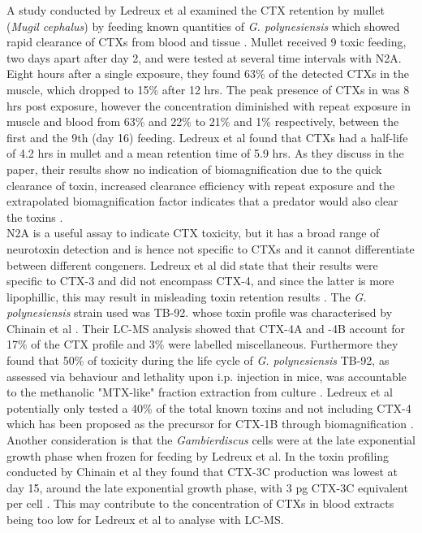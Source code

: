 \documentclass[12pt]{article}
\begin{document}
A study conducted by Ledreux et al examined the CTX retention by mullet (\emph{Mugil cephalus}) by feeding known quantities of \emph{G. polynesiensis} which showed rapid clearance of CTXs from blood and tissue \cite{ledreux2014dynamics}. 
Mullet received 9 toxic feeding, two days apart after day 2, and were tested at several time intervals with N2A. Eight hours after a single exposure, they found 63\% of the detected CTXs in the muscle, which dropped to 15\% after 12 hrs. The peak presence of CTXs in was 8 hrs post exposure, however the concentration diminished with repeat exposure in muscle and blood from 63\% and 22\% to 21\% and 1\% respectively, between the first and the 9th (day 16) feeding. Ledreux et al found that CTXs had a half-life of 4.2 hrs in mullet and a mean retention time of 5.9 hrs. As they discuss in the paper, their results show no indication of biomagnification due to the quick clearance of toxin, increased clearance efficiency with repeat exposure and the extrapolated biomagnification factor indicates that a predator would also clear the toxins  \cite{ledreux2014dynamics}. \\
 N2A is a useful assay to indicate CTX toxicity, but it has a broad range of neurotoxin detection and is  hence not specific to CTXs \cite{ebesu2012comment} and it cannot differentiate between different congeners. Ledreux et al did state that their results were specific to CTX-3 and did not encompass CTX-4, and since the latter is more lipophillic, this may result in misleading toxin retention results \cite{ledreux2014dynamics}. The \emph{G. polynesiensis} strain used was TB-92. whose toxin profile was characterised by Chinain et al \cite{chinain2010growth}. Their LC-MS analysis showed that CTX-4A and -4B account for 17\% of the CTX profile and 3\% were labelled miscellaneous. Furthermore they found that 50\% of toxicity during the life cycle of \emph{G. polynesiensis} TB-92, as assessed via behaviour and lethality upon i.p. injection in mice, was accountable to the methanolic "MTX-like" fraction extraction from culture \cite{chinain2010growth}. Ledreux et al potentially only tested a 40\% of the total known toxins and not including CTX-4 which has been proposed as the precursor for CTX-1B through biomagnification \cite{murata1990structures}. Another consideration is that the \emph{Gambierdiscus} cells were at the late exponential growth phase when frozen for feeding by Ledreux et al. In the toxin profiling conducted by Chinain et al they found that CTX-3C production was lowest at day 15, around the late exponential growth phase, with 3 pg CTX-3C equivalent per cell \cite{chinain2010growth}. This may contribute to the concentration of CTXs in blood extracts being too low for Ledreux et al to analyse with LC-MS. \\
\end{document}
